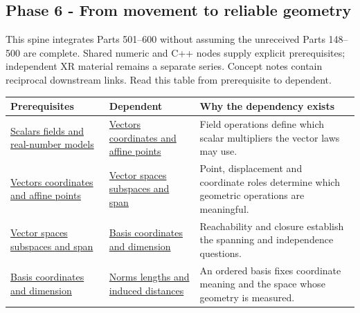 \subsection{Phase 6 - From movement to reliable geometry}\label{appendix-4ad47bdd269a-phase-6---from-movement-to-reliable-geometry}

This spine integrates Parts 501--600 without assuming the unreceived Parts 148--500 are complete. Shared numeric and C++ nodes supply explicit prerequisites; independent XR material remains a separate series. Concept notes contain reciprocal downstream links. Read this table from prerequisite to dependent.

{\def\LTcaptype{none} %
\begin{longtable}[]{@{}
  >{\raggedright\arraybackslash}p{}
  >{\raggedright\arraybackslash}p{}
  >{\raggedright\arraybackslash}p{}@{}}
\toprule\noalign{}
\begin{minipage}[b]{\linewidth}\raggedright
Prerequisites
\end{minipage} & \begin{minipage}[b]{\linewidth}\raggedright
Dependent
\end{minipage} & \begin{minipage}[b]{\linewidth}\raggedright
Why the dependency exists
\end{minipage} \\
\midrule\noalign{}
\endhead
\bottomrule\noalign{}
\endlastfoot
\hyperref[appendix-52051ad550fe]{Scalars fields and real-number models} & \hyperref[appendix-0659864c0aa3]{Vectors coordinates and affine points} & Field operations define which scalar multipliers the vector laws may use. \\
\hyperref[appendix-0659864c0aa3]{Vectors coordinates and affine points} & \hyperref[appendix-173b52c063ae]{Vector spaces subspaces and span} & Point, displacement and coordinate roles determine which geometric operations are meaningful. \\
\hyperref[appendix-173b52c063ae]{Vector spaces subspaces and span} & \hyperref[appendix-ce0341f7ea0d]{Basis coordinates and dimension} & Reachability and closure establish the spanning and independence questions. \\
\hyperref[appendix-ce0341f7ea0d]{Basis coordinates and dimension} & \hyperref[appendix-49933872bb51]{Norms lengths and induced distances} & An ordered basis fixes coordinate meaning and the space whose geometry is measured. \\

\end{longtable}}
